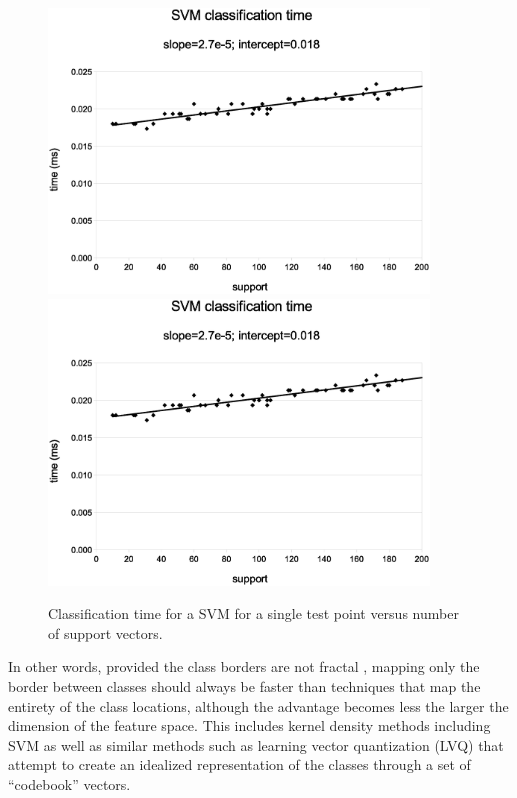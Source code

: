 \begin{figure}
  \ifsubmit
    \includegraphics[width=0.9\textwidth]{svm_time}
  \else
    \includegraphics[width=0.9\textwidth]{../svm_time}
  \fi
\caption{Classification time for a SVM for a single test point versus number of support vectors.}
\label{svm_time}
\end{figure}

In other words, provided the class borders are not fractal \citep{Ott1993}, 
mapping only the border between classes should always be
faster than techniques that map the entirety of the class locations,
{\color{red} although the advantage becomes less the larger the dimension of the 
feature space.}
This includes kernel density methods including SVM as well
as similar methods such as learning vector quantization (LVQ) 
\citep{Kohonen2000,LVQ_PAK}
that attempt to create an idealized representation of the classes through
a set of ``codebook'' vectors.

